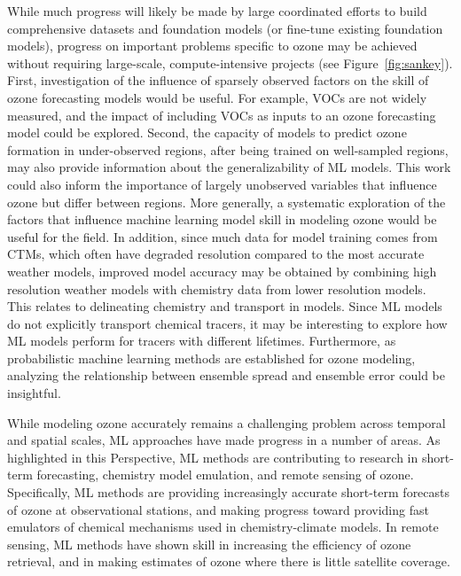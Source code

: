 \documentclass[gmd, manuscript]{copernicus}
\begin{document}

While much progress will likely be made by large coordinated efforts to build comprehensive datasets and foundation models (or fine-tune existing foundation models), progress on important problems specific to ozone may be achieved without requiring large-scale, compute-intensive projects (see Figure~\ref{fig:sankey}). First, investigation of the influence of sparsely observed factors on the skill of ozone forecasting models would be useful. For example, VOCs are not widely measured, and the impact of including VOCs as inputs to an ozone forecasting model could be explored. Second, the capacity of models to predict ozone formation in under-observed regions, after being trained on well-sampled regions, may also provide information about the generalizability of ML models. This work could also inform the importance of largely unobserved variables that influence ozone but differ between regions. More generally, a systematic exploration of the factors that influence machine learning model skill in modeling ozone would be useful for the field. In addition, since much data for model training comes from CTMs, which often have degraded resolution compared to the most accurate weather models, improved model accuracy may be obtained by combining high resolution weather models with chemistry data from lower resolution models. This relates to delineating chemistry and transport in models. Since ML models do not explicitly transport chemical tracers, it may be interesting to explore how ML models perform for tracers with different lifetimes. Furthermore, as probabilistic machine learning methods are established for ozone modeling, analyzing the relationship between ensemble spread and ensemble error could be insightful. %

\conclusions  %
While modeling ozone accurately remains a challenging problem across temporal and spatial scales, ML approaches have made progress in a number of areas. As highlighted in this Perspective, ML methods are contributing to research in short-term forecasting, chemistry model emulation, and remote sensing of ozone. Specifically, ML methods are providing increasingly accurate short-term forecasts of ozone at observational stations, and making progress toward providing fast emulators of chemical mechanisms used in chemistry-climate models. In remote sensing, ML methods have shown skill in increasing the efficiency of ozone retrieval, and in making estimates of ozone where there is little satellite coverage. 
\end{document}
